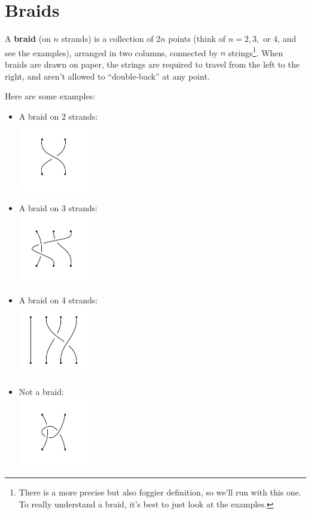 \documentclass[12 pt]{article}
\begin{document}
\newpage
\section{Braids}
A \textbf{braid} (on $n$ strands) is a collection of $2n$ points (think of $n=2, 3,$ or $4$, and see the examples), arranged in two columns, connected by $n$ strings\footnote{There is a more precise but also foggier definition, so we'll run with this one. To really understand a braid, it's best to just look at the examples.}. When braids are drawn on paper, the strings are required to travel from the left to the right, and aren't allowed to ``double-back'' at any point.

Here are some examples:
\begin{itemize}
\item A braid on $2$ strands:\\ \includegraphics*[height = 1.2in]{example_1}
\item A braid on $3$ strands:\\ \includegraphics*[height = 1.2in]{example_2}
\item A braid on $4$ strands:\\ \includegraphics*[height = 1.2in]{example_3}
\item Not a braid:\\ \includegraphics*[height = 1.2in]{example_4}
\end{itemize}
\end{document}
